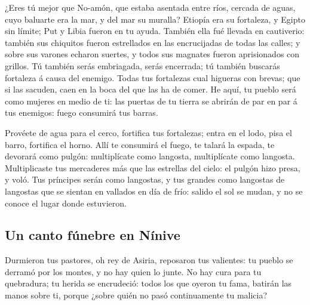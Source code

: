  ¿Eres tú mejor que No-amón, que estaba asentada entre
ríos, cercada de aguas, cuyo baluarte era la mar, y del mar su muralla?
 Etiopía era su fortaleza, y Egipto sin límite; Put y
Libia fueron en tu ayuda.  También ella fué llevada en
cautiverio: también sus chiquitos fueron estrellados en las encrucijadas
de todas las calles; y sobre sus varones echaron suertes, y todos sus
magnates fueron aprisionados con grillos.  Tú también
serás embriagada, serás encerrada; tú también buscarás fortaleza á causa
del enemigo.  Todas tus fortalezas cual higueras con
brevas; que si las sacuden, caen en la boca del que las ha de comer.
 He aquí, tu pueblo será como mujeres en medio de ti: las
puertas de tu tierra se abrirán de par en par á tus enemigos: fuego
consumirá tus barras.

 Provéete de agua para el cerco, fortifica tus
fortalezas; entra en el lodo, pisa el barro, fortifica el horno.
 Allí te consumirá el fuego, te talará la espada, te
devorará como pulgón: multiplícate como langosta, multiplícate como
langosta.  Multiplicaste tus mercaderes más que las
estrellas del cielo: el pulgón hizo presa, y voló.  Tus
príncipes serán como langostas, y tus grandes como langostas de
langostas que se sientan en vallados en día de frío: salido el sol se
mudan, y no se conoce el lugar donde estuvieron.

\hypertarget{un-canto-fuxfanebre-en-nuxednive}{%
\subsection{Un canto fúnebre en
Nínive}\label{un-canto-fuxfanebre-en-nuxednive}}

 Durmieron tus pastores, oh rey de Asiria, reposaron tus
valientes: tu pueblo se derramó por los montes, y no hay quien lo junte.
 No hay cura para tu quebradura; tu herida se encrudeció:
todos los que oyeron tu fama, batirán las manos sobre ti, porque ¿sobre
quién no pasó continuamente tu malicia?
